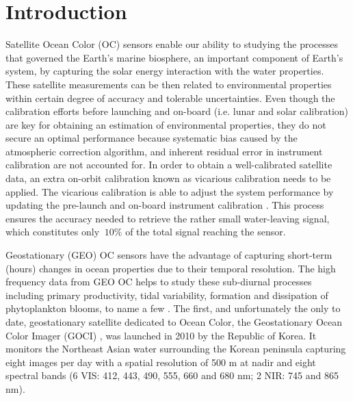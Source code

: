 \documentclass[10pt]{article}
\begin{document}






\section{Introduction}
Satellite Ocean Color (OC) sensors enable our ability to studying the processes that governed the Earth's marine biosphere, an important component of Earth's system, by capturing the solar energy interaction with the water properties.
These satellite measurements can be then related to environmental properties within certain degree of accuracy and tolerable uncertainties. 
Even though the calibration efforts before launching and on-board (i.e. lunar and solar calibration) are key for obtaining an estimation of environmental properties, they do not secure an optimal performance because systematic bias caused by the atmospheric correction algorithm, and inherent residual error in instrument calibration are not accounted for. 
In order to obtain a well-calibrated satellite data, an extra on-orbit calibration known as vicarious calibration needs to be applied. 
The vicarious calibration is able to adjust the system performance by updating the pre-launch and on-board instrument calibration \cite{Franz:07}. 
This process ensures the accuracy needed to retrieve the rather small water-leaving signal, which constitutes only $~10\%$ of the total signal reaching the sensor.

Geostationary (GEO) OC sensors have the advantage of capturing short-term (hours) changes in ocean properties due to their temporal resolution. 
The high frequency data from GEO OC helps to study these sub-diurnal processes including primary productivity, tidal variability, formation and dissipation of phytoplankton blooms, to name a few \cite{Ruddick2014}. 
The first, and unfortunately the only to date, geostationary satellite dedicated to Ocean Color, the Geostationary Ocean Color Imager (GOCI) \cite{Ryu2012}, was launched in 2010 by the Republic of Korea. It monitors the Northeast Asian water surrounding the Korean peninsula capturing eight images per day with a spatial resolution of 500 m at nadir and eight spectral bands (6 VIS: 412, 443, 490, 555, 660 and 680 nm; 2 NIR: 745 and 865 nm).
\end{document}
